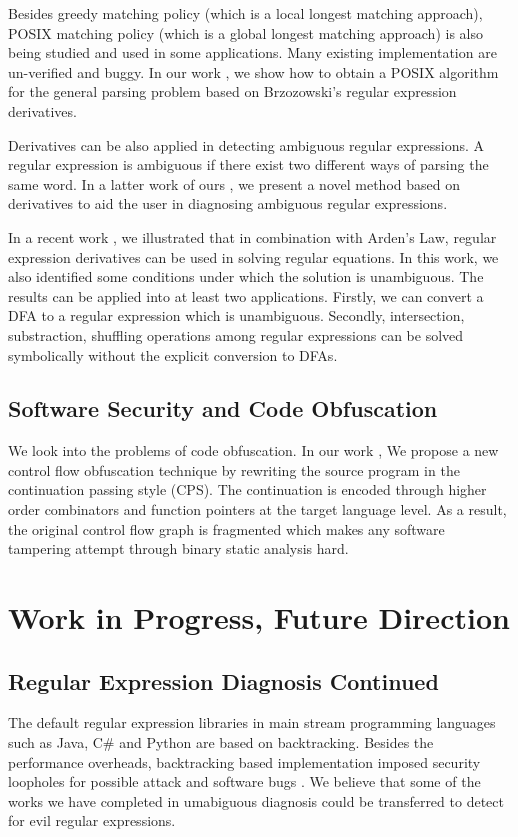 \documentclass[12pt]{article}
\theoremstyle{plain} \numberwithin{equation}{section}
\theoremstyle{definition}
\begin{document}
Besides greedy matching policy (which is a local longest matching approach),
POSIX matching policy (which is a global longest matching approach) is also being studied
and used in some applications. Many existing implementation are un-verified and buggy.
In our work \cite{DBLP:conf/flops/SulzmannL14}, 
we show how to obtain a POSIX algorithm for the general parsing problem based on Brzozowski’s regular expression derivatives.

Derivatives can be also applied in detecting ambiguous regular
expressions. A regular expression is ambiguous if there exist two
different ways of parsing the same word. In a latter work of ours
\cite{DBLP:conf/wia/SulzmannL16}, we present a novel method
based on derivatives to aid the user in diagnosing ambiguous regular expressions.


In a recent work \cite{DBLP:journals/corr/abs-1908-03710}, we
illustrated that in combination with Arden's Law, regular expression derivatives can be used in solving
regular equations. In this work, we also identified some conditions
under which the solution is unambiguous. The results can be applied
into at least two applications. Firstly, we can convert a DFA to  a
regular expression which is unambiguous. Secondly, intersection,
substraction, shuffling operations among regular expressions can be
solved symbolically without the explicit conversion to DFAs.



\subsection{Software Security and Code Obfuscation}

We look into the problems of code obfuscation. In our work
\cite{DBLP:conf/pepm/Lu19},
We propose a new control flow obfuscation technique by rewriting the
source program in the continuation passing style (CPS).
The continuation is encoded through higher order combinators and
function pointers at the target language level.
As a result, the original control flow graph is fragmented which makes
any software tampering attempt through binary static analysis hard. 



\section{Work in Progress, Future Direction}

\subsection{Regular Expression Diagnosis Continued}
The default regular expression libraries in main stream programming
languages such as Java, C\# and Python are based on backtracking. Besides
the performance overheads, backtracking based implementation imposed
security loopholes for possible attack \cite{ReDoS} and software bugs
\cite{JDK-5050507}. We believe that some of the works we have
completed in umabiguous diagnosis could be transferred to detect for
evil regular expressions.
\end{document}
